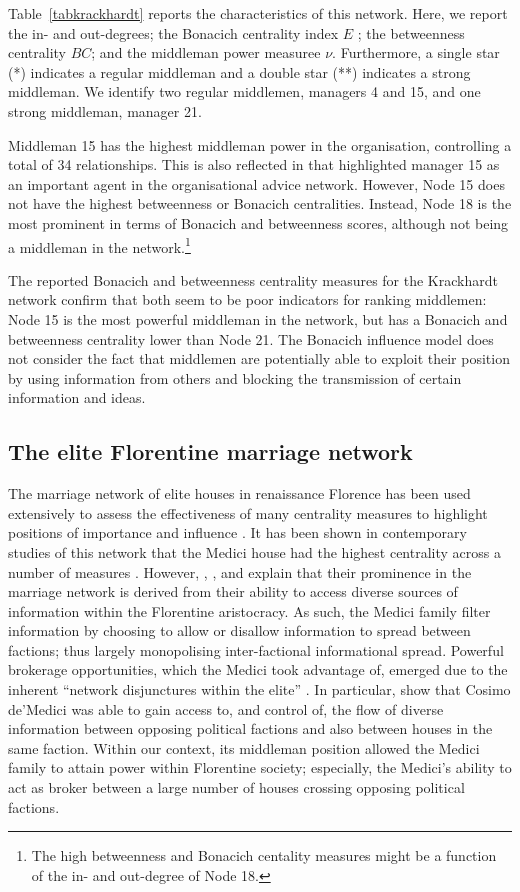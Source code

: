 Table~\ref{tabkrackhardt} reports the characteristics of this network. Here, we report the in- and out-degrees; the Bonacich centrality index $E$ \citep{Bonacich1972,Bonacich1987}; the betweenness centrality $BC$; and the middleman power measuree $\nu$. Furthermore, a single star (*) indicates a regular middleman and a double star (**) indicates a strong middleman. We identify two regular middlemen, managers 4 and 15, and one strong middleman, manager 21. 

Middleman 15 has the highest middleman power in the organisation, controlling a total of 34 relationships. This is also reflected in that \citet{Krackhardt1987} highlighted manager 15 as an important agent in the organisational advice network. However, Node 15 does not have the highest betweenness or Bonacich centralities. Instead, Node 18 is the most prominent in terms of Bonacich and betweenness scores, although not being a middleman in the network.\footnote{The high betweenness and Bonacich centality measures might be a function of the in- and out-degree of Node 18.}

The reported Bonacich and betweenness centrality measures for the Krackhardt network confirm that both seem to be poor indicators for ranking middlemen: Node 15 is the most powerful middleman in the network, but has a Bonacich and betweenness centrality lower than Node 21. The Bonacich influence model does not consider the fact that middlemen are potentially able to exploit their position by using information from others and blocking the transmission of certain information and ideas.

\subsection{The elite Florentine marriage network}

The marriage network of elite houses in renaissance Florence has been used extensively to assess the effectiveness of many centrality measures to highlight positions of importance and influence \citep{Newman2003betweenness}. It has been shown in contemporary studies of this network that the Medici house had the highest centrality across a number of measures \citep[Chapter 2]{Jackson2008}. However, \citet{Roover1963}, \citet{Padgett1994}, and \citet{Goldthwaite2009} explain that their prominence in the marriage network is derived from their ability to access diverse sources of information within the Florentine aristocracy. As such, the Medici family filter information by choosing to allow or disallow information to spread between factions; thus largely monopolising inter-factional informational spread. Powerful brokerage opportunities, which the Medici took advantage of, emerged due to the inherent ``network disjunctures within the elite'' \citep[p.~1259]{Padgett1993}. In particular, \citet{Padgett1993} show that Cosimo de'Medici was able to gain access to, and control of, the flow of diverse information between opposing political factions and also between houses in the same faction. Within our context, its middleman position allowed the Medici family to attain power within Florentine society; especially, the Medici's ability to act as broker between a large number of houses crossing opposing political factions.

